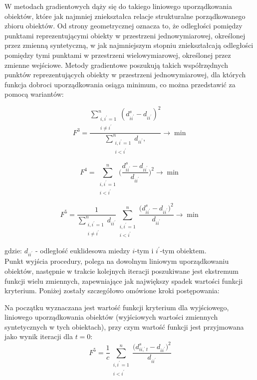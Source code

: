 \documentclass[12pt,a4paper]{report}
\begin{document}
W metodach gradientowych dąży się do takiego liniowego uporządkowania obiektów, które jak najmniej zniekształca relacje strukturalne porządkowanego zbioru obiektów. Od strony geometrycznej oznacza to, że odległości pomiędzy punktami reprezentującymi obiekty w przestrzeni jednowymiarowej, określonej przez zmienną syntetyczną, w jak najmniejszym stopniu zniekształcają odległości pomiędzy tymi punktami w przestrzeni wielowymiarowej, określonej przez zmienne wejściowe. Metody gradientowe poszukują takich współrzędnych punktów reprezentujących obiekty w przestrzeni jednowymiarowej, dla których funkcja dobroci uporządkowania osiąga minimum, co można przedstawić za pomocą wariantów:
 
\begin{equation}
F^{3}=\frac{\sum_{\substack{i,i^{'}=1\\i \neq i^{'}}}^{n} (d_{ii^{'}}^{s} - d_{ii^{'}})^2 }{\sum_{\substack{i,i^{'}=1 \\ i<i^{'}}}^{n} d_{ii^{'}}, } \rightarrow     \min  
\end{equation}

\begin{equation}
F^{4}=\sum_{\substack{i,i^{'}=1 \\ i<i^{'}}}^{n} \bigg( \frac{d_{ii^{'}}^{s} - d_{ii^{'}}}{d_{ii^{'}}} \bigg) ^2  \rightarrow     \min  
\end{equation}

\begin{equation}
F^{5}=\frac{1}{\sum_ {\substack{i,i^{'}=1 \\ i\neq i^{'}}}^{n} d_{ii^{'}}} \sum_{\substack{i,i^{'}=1 \\ i<i^{'}}}^{n} \frac{\bigg(d_{ii^{'}}^{s} - d_{ii^{'}}\bigg)^2}{d_{ii^{'}}}\rightarrow     \min  
\end{equation}

gdzie:
\newline
$d_{ii^{'}}$ - odległość euklidesowa miedzy $i$-tym i $i^{'}$-tym obiektem.\\
\newline
Punkt wyjścia procedury, polega na dowolnym liniowym uporządkowaniu obiektów, następnie w trakcie kolejnych iteracji poszukiwane jest ekstremum funkcji wielu zmiennych, zapewniające jak największy spadek wartości funkcji kryterium. Poniżej zostały szczegółowo omówione kroki postępowania:

Na początku wyznaczana jest wartość funkcji kryterium dla wyjściowego, liniowego uporządkowania obiektów (wyjściowych wartości zmiennych syntetycznych w tych obiektach), przy czym wartość funkcji jest przyjmowana jako wynik iteracji dla $t = 0$:
\begin{equation}
F^{5}=\frac{1}{c} \sum_{\substack{i,i^{'}=1 \\ i<i^{'}}}^{n} \frac{\bigg(d_{ii,^{'}t}^{s} - d_{ii^{'}}\bigg)^2}{d_{ii^{'}}}
\end{equation}
\end{document}
